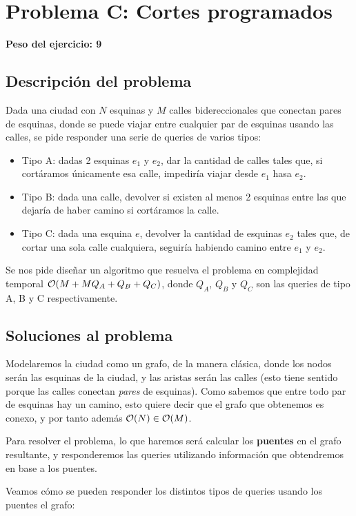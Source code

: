 \newpage{}
\section{Problema C: Cortes programados}
\textbf{Peso del ejercicio: 9}
\subsection{Descripción del problema}
Dada una ciudad con $N$ esquinas y $M$ calles bidereccionales que conectan 
pares de esquinas, donde se puede viajar entre cualquier par de esquinas 
usando las calles, se pide responder una serie de queries de varios tipos: 

\begin{itemize}
\item Tipo A: dadas 2 esquinas $e_1$ y $e_2$, dar la cantidad de calles tales que, 
si cortáramos únicamente esa calle, impediría viajar desde $e_1$ hasa $e_2$. 
\item Tipo B: dada una calle, devolver si existen al menos 2 esquinas entre las 
que dejaría de haber camino si cortáramos la calle. 
\item Tipo C: dada una esquina $e$, devolver la cantidad de esquinas $e_2$ tales que, 
de cortar una sola calle cualquiera, seguiría habiendo camino entre $e_1$ y $e_2$.
\end{itemize}

Se nos pide diseñar un algoritmo que resuelva el problema en complejidad temporal 
$\mathcal{O}(M + MQ_A + Q_B + Q_C)$, donde $Q_A$, $Q_B$ y $Q_C$ son las 
queries de tipo A, B y C respectivamente. 

\subsection{Soluciones al problema}
Modelaremos la ciudad como un grafo, de la manera clásica, donde los nodos 
serán las esquinas de la ciudad, y las aristas serán las calles (esto 
tiene sentido porque las calles conectan \textit{pares} de esquinas). 
Como sabemos que entre todo par de esquinas hay un camino, esto quiere 
decir que el grafo que obtenemos es conexo, y por tanto 
además $\mathcal{O}(N) \in \mathcal{O}(M)$.

Para resolver el problema, lo que haremos será calcular los \textbf{puentes} 
en el grafo resultante, y responderemos las queries utilizando información 
que obtendremos en base a los puentes. 

Veamos cómo se pueden responder los distintos tipos de queries usando 
los puentes el grafo: \\

